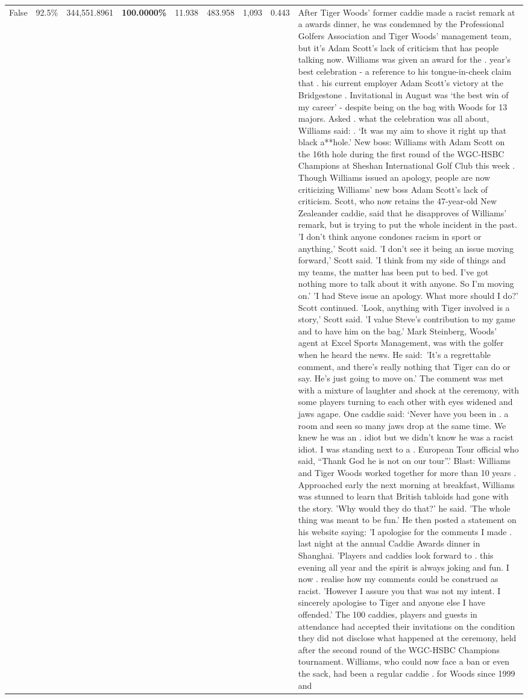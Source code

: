 \begin{table}[H]
\begin{tabular}{lllrlllll}
False & 92.5\% & 344,551.8961 & \bfseries \color{red} 100.0000\% & 11.938 & 483.958 & 1,093 & 0.443 & After Tiger Woods' former caddie made a racist remark at a awards dinner, he was condemned by the Professional Golfers Association and Tiger Woods' management team, but it's Adam Scott's lack of criticism that has people talking now. Williams was given an award for the . year’s best celebration - a reference to his tongue-in-cheek claim that . his current employer Adam Scott’s victory at the Bridgestone . Invitational in August was ‘the best win of my career’ - despite being on the bag with Woods for 13 majors. Asked . what the celebration was all about, Williams said: . ‘It was my aim to shove it right up that black a**hole.’ New boss: Williams with Adam Scott  on the 16th hole during the first round of the WGC-HSBC Champions at Sheshan International Golf Club this week . Though Williams issued an apology, people are now criticizing Williams' new boss Adam Scott's lack of criticism. Scott, who now retains the 47-year-old New Zealeander caddie, said that he disapproves of Williams' remark, but is trying to put the whole incident in the past. 'I don't think anyone condones racism in sport or anything,' Scott said. 'I don't see it being an issue moving forward,' Scott said. 'I think from my side of things and my teams, the matter has been put to bed. I've got nothing more to talk about it with anyone. So I'm moving on.' 'I had Steve issue an apology. What more should I do?' Scott continued. 'Look, anything with Tiger involved is a story,' Scott said. 'I value Steve's contribution to my game and to have him on the bag.' Mark Steinberg, Woods' agent at Excel Sports Management, was with the golfer when he heard the news. He said: 'It's a regrettable comment, and there's really nothing that Tiger can do or say. He's just going to move on.' The comment was met with a mixture of laughter and shock at the ceremony, with some players turning to each other with eyes widened and jaws agape. One caddie said: ‘Never have you been in . a room and seen so many jaws drop at the same time. We knew he was an . idiot but we didn’t know he was a racist idiot. I was standing next to a . European Tour official who said, “Thank God he is not on our tour”.’ Blast: Williams and Tiger Woods worked together for more than 10 years . Approached early the next morning at breakfast, Williams was stunned to learn that British tabloids had gone with the story. 'Why would they do that?' he said. 'The whole thing was meant to be fun.' He then posted a statement on his website saying: 'I apologise for the comments I made . last night at the annual Caddie Awards dinner in Shanghai. 'Players and caddies look forward to . this evening all year and the spirit is always joking and fun. I now . realise how my comments could be construed as racist. 'However I assure you that was not my intent. I sincerely apologise to Tiger and anyone else I have offended.' The 100 caddies, players and guests in attendance had accepted their invitations on the condition they did not disclose what happened at the ceremony, held after the second round of the WGC-HSBC Champions tournament. Williams, who could now face a ban or even the sack, had been a regular caddie . for Woods since 1999 and 
\end{tabular}
\end{table}
